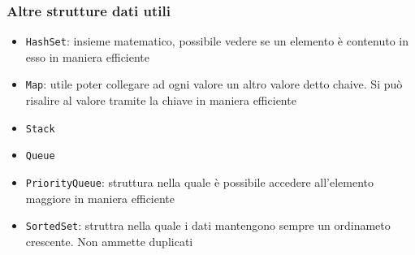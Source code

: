 \subsubsection{Altre strutture dati utili}
\begin{itemize}
	\item \verb|HashSet|: insieme matematico, possibile vedere se un elemento è contenuto in esso in maniera efficiente
	\item \verb|Map|: utile poter collegare ad ogni valore un altro valore detto chaive. Si può risalire al valore tramite la chiave in maniera efficiente
	\item \verb|Stack|
	\item \verb|Queue|
	\item \verb|PriorityQueue|: struttura nella quale è possibile accedere all'elemento maggiore in maniera efficiente
	\item \verb|SortedSet|: struttra nella quale i dati mantengono sempre un ordinameto crescente. Non ammette duplicati
\end{itemize}

